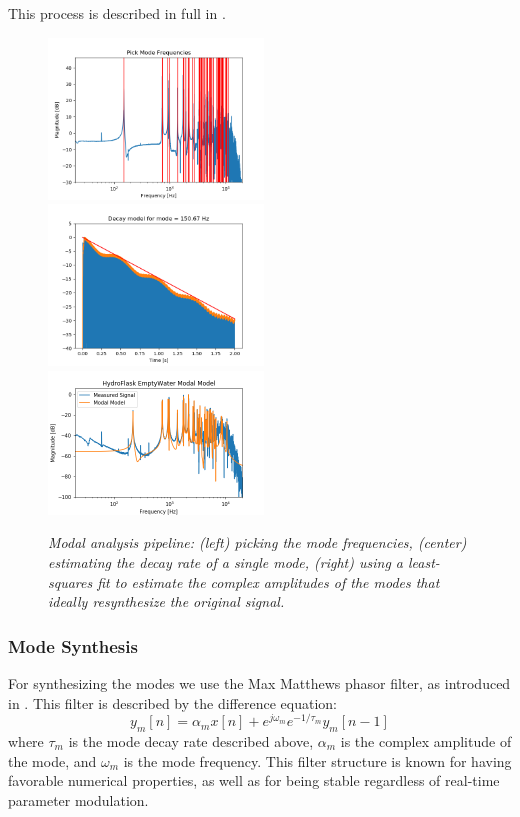 \documentclass[twoside,a4paper]{article}
\begin{document}
This process is described in full in \cite{rau:das:canfielddafilou:carillon:2019}.
%
\begin{figure}
    \centering
    \includegraphics[width=2.25in]{Figures/ModePick_ex}
    \includegraphics[width=2.25in]{Figures/DecayFit_ex}
    \includegraphics[width=2.25in]{../Figures/HydroFlask/empty}
    \caption{\it{Modal analysis pipeline: (left) picking the mode frequencies,
    (center) estimating the decay rate of a single mode,
    (right) using a least-squares fit to estimate the complex
    amplitudes of the modes that ideally resynthesize the
    original signal.}}
    \label{fig:modal_analysis}
\end{figure}
%
\subsubsection{Mode Synthesis} \label{sec:synthesis}
%
For synthesizing the modes we use the Max Matthews
phasor filter, as introduced in \cite{phasorfilter}.
This filter is described by the difference equation:
\begin{equation}
    y_m[n] = \alpha_m x[n] + e^{j\omega_m} e^{-1/\tau_m} y_m[n-1]
    \label{eq:phasor}
\end{equation}
%
where $\tau_m$ is the mode decay rate described above,
$\alpha_m$ is the complex amplitude of the mode, and $\omega_m$
is the mode frequency. This filter structure is known for
having favorable numerical properties, as well as for being
stable regardless of real-time parameter modulation.
\end{document}
